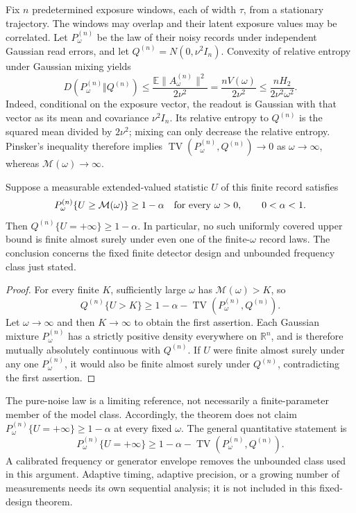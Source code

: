 Fix $n$ predetermined exposure windows, each of width $\tau$, from a
stationary trajectory. The windows may overlap and their latent exposure
values may be correlated. Let $P_\omega^{(n)}$ be the law of their noisy
records under independent Gaussian read errors, and let
$Q^{(n)}=N(0,\nu^2I_n)$. Convexity of relative entropy under Gaussian
mixing yields
\begin{equation}
 D(P_\omega^{(n)}\Vert Q^{(n)})
 \leq\frac{\mathbb E\|A_\omega^{(n)}\|^2}{2\nu^2}
 =\frac{nV(\omega)}{2\nu^2}
 \leq\frac{nH_2}{2\nu^2\omega^2}.
 \label{eq:dg-mixture-kl}
\end{equation}
Indeed, conditional on the exposure vector, the readout is Gaussian with
that vector as its mean and covariance $\nu^2I_n$. Its relative entropy
to $Q^{(n)}$ is the squared mean divided by $2\nu^2$; mixing can only
decrease the relative entropy. Pinsker's inequality therefore implies
$\operatorname{TV}(P_\omega^{(n)},Q^{(n)})\to0$ as
$\omega\to\infty$, whereas $\mathcal M(\omega)\to\infty$.

\begin{theorem}
\label{thm:dg-upper-obstruction}
Suppose a measurable extended-valued statistic $U$ of this finite record
satisfies
\[
 P_\omega^{(n)}\{U\geq\mathcal M(\omega)\}\geq1-\alpha
 \quad\hbox{for every }\omega>0,
 \qquad 0<\alpha<1.
\]
Then $Q^{(n)}\{U=+\infty\}\geq1-\alpha$. In particular, no such
uniformly covered upper bound is finite almost surely under even one of the
finite-$\omega$ record laws. The conclusion concerns the fixed finite
detector design and unbounded frequency class just stated.
\end{theorem}

\begin{proof}
For every finite $K$, sufficiently large $\omega$ has
$\mathcal M(\omega)>K$, so
\[
 Q^{(n)}\{U>K\}
 \geq1-\alpha-\operatorname{TV}(P_\omega^{(n)},Q^{(n)}).
\]
Let $\omega\to\infty$ and then $K\to\infty$ to obtain the first
assertion. Each Gaussian mixture $P_\omega^{(n)}$ has a strictly positive
density everywhere on $\mathbb R^n$, and is therefore mutually absolutely
continuous with $Q^{(n)}$. If $U$ were finite almost surely under any one
$P_\omega^{(n)}$, it would also be finite almost surely under $Q^{(n)}$,
contradicting the first assertion.
\end{proof}

The pure-noise law is a limiting reference, not necessarily a finite-parameter
member of the model class. Accordingly, the theorem does not claim
$P_\omega^{(n)}\{U=+\infty\}\geq1-\alpha$ at every fixed $\omega$.
The general quantitative statement is
\[
 P_\omega^{(n)}\{U=+\infty\}
 \geq1-\alpha-\operatorname{TV}(P_\omega^{(n)},Q^{(n)}).
\]
A calibrated frequency or generator envelope removes the unbounded class
used in this argument. Adaptive timing, adaptive precision, or a growing
number of measurements needs its own sequential analysis; it is not included
in this fixed-design theorem.

